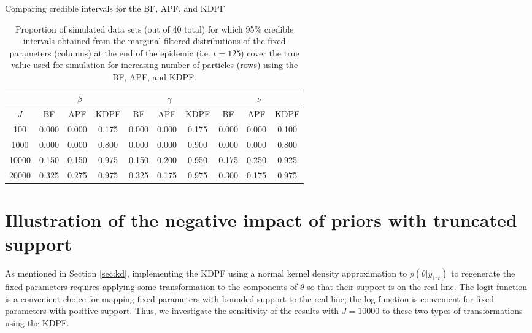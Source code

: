 \begin{table}
\ssp
\centering
\caption{Comparing credible intervals for the BF, APF, and KDPF} \label{tab:epid:pfs}
\begin{tabular}{|c|ccc|ccc|ccc|}
\hline
  & \multicolumn{3}{|c|}{$\beta$} & \multicolumn{3}{|c|}{$\gamma$} & \multicolumn{3}{|c|}{$\nu$} \\
  \hline
  $J$ & BF & APF & KDPF & BF & APF & KDPF & BF & APF & KDPF \\
  \hline
  100 & 0.000 & 0.000 & 0.175 & 0.000 & 0.000 & 0.175 & 0.000 & 0.000 & 0.100 \\
  \hline
  1000 & 0.000 & 0.000 & 0.800 & 0.000 & 0.000 & 0.900 & 0.000 & 0.000 & 0.800 \\
  \hline
  10000 & 0.150 & 0.150 & 0.975 & 0.150 & 0.200 & 0.950 & 0.175 & 0.250 & 0.925 \\
  \hline
  20000 & 0.325 & 0.275 & 0.975 & 0.325 & 0.175 & 0.975 & 0.300 & 0.175 & 0.975 \\
\hline
\end{tabular}
\caption*{Proportion of simulated data sets (out of 40 total) for which 95\% credible intervals obtained from the marginal filtered distributions of the fixed parameters (columns) at the end of the epidemic (i.e. $t = 125$) cover the true value used for simulation for increasing number of particles (rows) using the BF, APF, and KDPF.}
\end{table}

\section{Illustration of the negative impact of priors with truncated support} \label{sec:epid:prior}

As mentioned in Section \ref{sec:kd}, implementing the KDPF using a normal kernel density approximation to $p(\theta|y_{1:t})$ to regenerate the fixed parameters requires applying some transformation to the components of $\theta$ so that their support is on the real line. The logit function is a convenient choice for mapping fixed parameters with bounded support to the real line; the log function is convenient for fixed parameters with positive support. Thus, we investigate the sensitivity of the results with $J = 10000$ to these two types of transformations using the KDPF.

